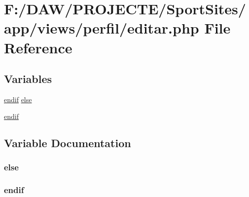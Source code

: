 \hypertarget{perfil_2editar_8php}{}\section{F\+:/\+D\+A\+W/\+P\+R\+O\+J\+E\+C\+T\+E/\+Sport\+Sites/app/views/perfil/editar.php File Reference}
\label{perfil_2editar_8php}
\subsection*{Variables}
\begin{DoxyCompactItemize}
\item 
\hyperlink{header_8php_a2f576def868d9b1e442c2042a246de2a}{endif} \hyperlink{perfil_2editar_8php_a963df2a8541ff906745b0f1db557dcdc}{else}
\item 
\hyperlink{perfil_2editar_8php_a82cd33ca97ff99f2fcc5e9c81d65251b}{endif}
\end{DoxyCompactItemize}


\subsection{Variable Documentation}
\hypertarget{perfil_2editar_8php_a963df2a8541ff906745b0f1db557dcdc}{}
\subsubsection[{else}]{ else}\label{perfil_2editar_8php_a963df2a8541ff906745b0f1db557dcdc}
\hypertarget{perfil_2editar_8php_a82cd33ca97ff99f2fcc5e9c81d65251b}{}
\subsubsection[{endif}]{\setlength{\rightskip}{0pt plus 5cm}endif}\label{perfil_2editar_8php_a82cd33ca97ff99f2fcc5e9c81d65251b}
